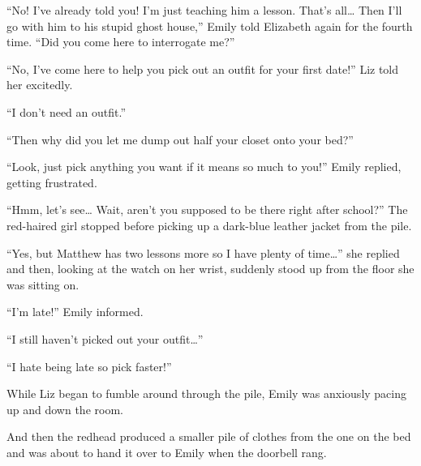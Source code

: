 “No! I’ve already told you! I’m just teaching him a lesson. That’s all… Then I’ll go with him to his stupid ghost house,” Emily told Elizabeth again for the fourth time. “Did you come here to interrogate me?”

“No, I’ve come here to help you pick out an outfit for your first date!” Liz told her excitedly.

“I don’t need an outfit.”

“Then why did you let me dump out half your closet onto your bed?”

“Look, just pick anything you want if it means so much to you!” Emily replied, getting frustrated.

“Hmm, let’s see… Wait, aren’t you supposed to be there right after school?” The red-haired girl stopped before picking up a dark-blue leather jacket from the pile.

“Yes, but Matthew has two lessons more so I have plenty of time…” she replied and then, looking at the watch on her wrist, suddenly stood up from the floor she was sitting on.

“I’m late!” Emily informed.

“I still haven't picked out your outfit…”

“I hate being late so pick faster!”

While Liz began to fumble around through the pile, Emily was anxiously pacing up and down the room.

And then the redhead produced a smaller pile of clothes from the one on the bed and was about to hand it over to Emily when the doorbell rang.